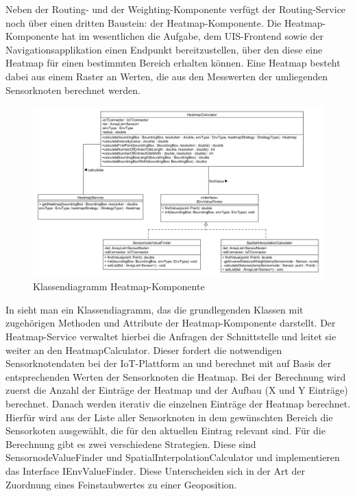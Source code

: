 Neben der Routing- und der Weighting-Komponente verfügt der Routing-Service noch über einen dritten Baustein: der Heatmap-Komponente. Die Heatmap-Komponente hat im wesentlichen die Aufgabe, dem UIS-Frontend sowie der Navigationsapplikation einen Endpunkt bereitzustellen, über den diese eine Heatmap für einen bestimmten Bereich erhalten können. Eine Heatmap besteht dabei aus einem Raster an Werten, die aus den Messwerten der umliegenden Sensorknoten berechnet werden. 

\begin{figure}[htb]
	\centering
	\includegraphics[width=\textwidth]{./ressourcen/routing/cdHeatmap.png}
	\caption{Klassendiagramm Heatmap-Komponente}
	\label{fig:heatmap_Klassendiagramm}
\end{figure}

In  sieht man ein Klassendiagramm, das die grundlegenden Klassen mit zugehörigen Methoden und Attribute der Heatmap-Komponente darstellt. Der Heatmap-Service verwaltet hierbei die Anfragen der Schnittstelle und leitet sie weiter an den HeatmapCalculator. Dieser fordert die notwendigen Sensorknotendaten bei der IoT-Plattform an und berechnet mit auf Basis der entsprechenden Werten der Sensorknoten die Heatmap. Bei der Berechnung wird zuerst die Anzahl der Einträge der Heatmap und der Aufbau (X und Y Einträge) berechnet. Danach werden iterativ die einzelnen Einträge der Heatmap berechnet. Hierfür wird aus der Liste aller Sensorknoten in dem gewünschten Bereich die Sensorkoten ausgewählt, die für den aktuellen Eintrag relevant sind. Für die Berechnung gibt es zwei verschiedene Strategien. Diese sind SensornodeValueFinder und SpatialInterpolationCalculator und implementieren das Interface IEnvValueFinder. Diese Unterscheiden sich in der Art der Zuordnung eines Feinstaubwertes zu einer Geoposition. 


